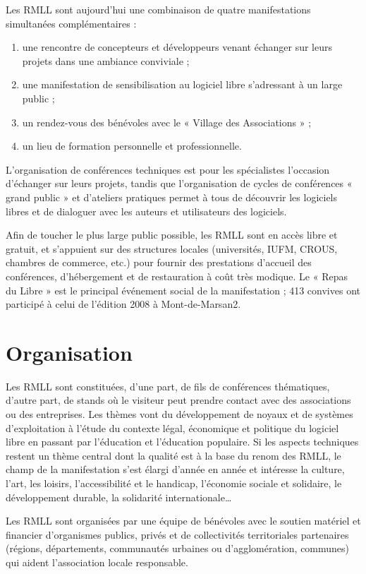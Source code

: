 \documentclass{rtxreport}
\begin{document}
Les RMLL sont aujourd'hui une combinaison de quatre manifestations simultanées complémentaires :
\begin{enumerate}
    \item une rencontre de concepteurs et développeurs venant échanger sur leurs projets dans une ambiance conviviale ;
    \item une manifestation de sensibilisation au logiciel libre s'adressant à un large public ;
    \item un rendez-vous des bénévoles avec le « Village des Associations » ;
    \item un lieu de formation personnelle et professionnelle.
\end{enumerate}
L'organisation de conférences techniques est pour les spécialistes l'occasion d'échanger sur leurs projets, tandis que l'organisation de cycles de conférences « grand public » et d'ateliers pratiques permet à tous de découvrir les logiciels libres et de dialoguer avec les auteurs et utilisateurs des logiciels.

Afin de toucher le plus large public possible, les RMLL sont en accès libre et gratuit, et s'appuient sur des structures locales (universités, IUFM, CROUS, chambres de commerce, etc.) pour fournir des prestations d'accueil des conférences, d'hébergement et de restauration à coût très modique. Le « Repas du Libre » est le principal événement social de la manifestation ; 413 convives ont participé à celui de l'édition 2008 à Mont-de-Marsan2.

\section{Organisation}

Les RMLL sont constituées, d'une part, de fils de conférences thématiques, d'autre part, de stands où le visiteur peut prendre contact avec des associations ou des entreprises. Les thèmes vont du développement de noyaux et de systèmes d'exploitation à l'étude du contexte légal, économique et politique du logiciel libre en passant par l'éducation et l'éducation populaire. Si les aspects techniques restent un thème central dont la qualité est à la base du renom des RMLL, le champ de la manifestation s'est élargi d'année en année et intéresse la culture, l'art, les loisirs, l'accessibilité et le handicap, l'économie sociale et solidaire, le développement durable, la solidarité internationale…

Les RMLL sont organisées par une équipe de bénévoles avec le soutien matériel et financier d'organismes publics, privés et de collectivités territoriales partenaires (régions, départements, communautés urbaines ou d'agglomération, communes) qui aident l'association locale responsable.
\end{document}
